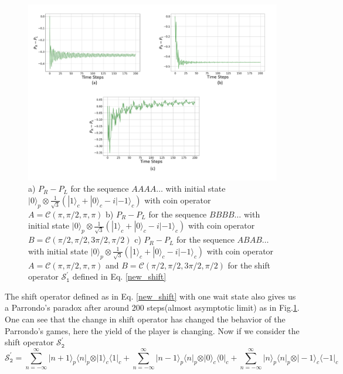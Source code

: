 \documentclass[english,aps,pra,amsmath,amssymb,showpacs,notitlepage,onecolumn]{revtex4-1}
\begin{document}
\begin{figure}[H]
\includegraphics[scale=0.65]{diff_shift_1.pdf}
 \caption{a) $P_R -P_L$ for the sequence $AAAA\ldots$ with initial state $| 0 \rangle_p \otimes \frac{1}{\sqrt{3}}(| 1 \rangle_c + | 0 \rangle_c - i | -1 \rangle_c)$ with coin operator $A = \mathcal{C}(\pi, \pi/2, \pi, \pi)$  b) $P_R -P_L$ for the sequence $BBBB\ldots$ with initial state $| 0 \rangle_p \otimes \frac{1}{\sqrt{3}}(| 1 \rangle_c + | 0 \rangle_c - i| -1 \rangle_c)$ with coin operator $B = \mathcal{C}(\pi/2, \pi/2, 3\pi/2, \pi/2)$ c) $P_R -P_L$ for the sequence $ABAB\ldots$ with initial state $| 0 \rangle_p \otimes \frac{1}{\sqrt{3}}(| 1 \rangle_c + | 0 \rangle_c - i| -1 \rangle_c)$ with coin operator $A = \mathcal{C}(\pi, \pi/2, \pi, \pi)$ and $B = \mathcal{C}(\pi/2, \pi/2, 3\pi/2, \pi/2)$ for the shift operator $\mathcal{S^{\prime}_\texttt{1}}$ defined in Eq. \ref{new_shift}}\label{shift1}
\end{figure}
The shift operator defined as in Eq. \ref{new_shift} with one wait state also gives us a Parrondo's paradox after around 200 steps(almost asymptotic limit) as in Fig.\ref{shift1}. One can see that the change in shift operator has changed the behavior of the Parrondo's games, here the yield of the player is changing. Now if we consider the shift operator $\mathcal{S^{\prime}_\texttt{2}}$ 
\begin{equation}\label{new_shift2}
\mathcal{S^{\prime}_\texttt{2}} =   \sum\limits_{n=-\infty}^{\infty}\vert n+1 \rangle_p \langle n \vert_p \otimes \vert  1\rangle_c \langle 1 \vert_c +   \sum\limits_{n=-\infty}^{\infty}\vert n-1 \rangle_p \langle n \vert_p \otimes \vert 0 \rangle_c \langle 0 \vert_c +   \sum\limits_{n=-\infty}^{\infty}\vert n \rangle_p \langle n \vert_p \otimes \vert -1 \rangle_c \langle -1 \vert_c
\end{equation}
\end{document}
